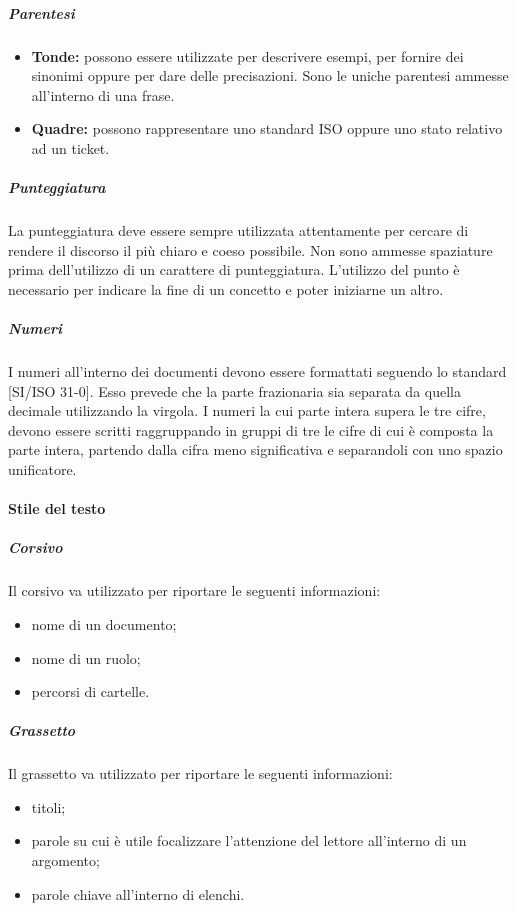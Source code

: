 \documentclass[../NormeProgetto.tex]{subfiles}
\begin{document}
			\subparagraph{Parentesi}
				\begin{itemize}
					\item \textbf{Tonde:} possono essere utilizzate per descrivere esempi, per fornire dei sinonimi oppure per dare delle precisazioni. Sono le uniche parentesi ammesse all'interno di una frase.
					\item \textbf{Quadre:} possono rappresentare uno standard ISO oppure uno stato relativo ad un ticket\g. 
				\end{itemize}

			
			\subparagraph{Punteggiatura}
				La punteggiatura  deve essere sempre utilizzata attentamente per cercare di rendere il discorso il più chiaro e coeso possibile. Non sono ammesse spaziature prima dell'utilizzo di un carattere di punteggiatura. L'utilizzo del punto è necessario per indicare la fine di un concetto e poter iniziarne un altro.
			
			\subparagraph{Numeri}
				I numeri all'interno dei documenti devono essere formattati seguendo lo standard [SI/ISO 31-0]. Esso prevede che la parte frazionaria sia separata da quella decimale utilizzando la virgola. I numeri la cui parte intera supera le tre cifre, devono essere scritti raggruppando in gruppi di tre le cifre di cui è composta la parte intera, partendo dalla cifra meno significativa e separandoli con uno spazio unificatore.
			
		\paragraph{Stile del testo}

			\subparagraph{Corsivo}
				Il corsivo va utilizzato per riportare le seguenti informazioni:
				\begin{itemize}
					\item nome di un documento;
					\item nome di un ruolo;
					\item percorsi di cartelle.
				\end{itemize}						
			
			\subparagraph{Grassetto}
				Il grassetto va utilizzato per riportare le seguenti informazioni:
				\begin{itemize}
					\item titoli;
					\item parole su cui è utile focalizzare l'attenzione del lettore all'interno di un argomento;
					\item parole chiave all'interno di elenchi.
				\end{itemize}						
			
\end{document}

